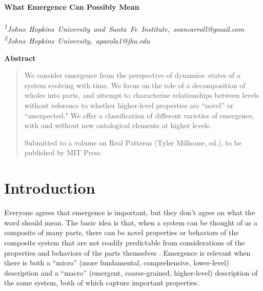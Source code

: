 \documentclass[12pt,english]{article}
\begin{document}
\baselineskip=16pt

\vspace{1cm}
\thispagestyle{empty}
\begin{center}
{\LARGE\bf
What Emergence Can Possibly Mean
}\\
\bigskip{} \\
 {\it \textsuperscript{1}\mbox{Johns Hopkins University and Santa Fe Institute, seancarroll@gmail.com}\vspace{1mm}
\textsuperscript{2}\mbox{Johns Hopkins University, aparola1@jhu.edu}\vspace{1mm}
}
 \end{center}
\bigskip
\centerline{\large\bf Abstract}



\begin{quote} \small
    We consider emergence from the perspective of dynamics: states of a system evolving with time.
    We focus on the role of a decomposition of wholes into parts, and attempt to characterize relationships between levels without reference to whether higher-level properties are ``novel'' or ``unexpected." 
    We offer a classification of different varieties of emergence, with and without new ontological elements at higher levels.

    Submitted to a volume on Real Patterns (Tyler Milhouse, ed.), to be published by MIT Press.
\end{quote}



\section*{Introduction}

Everyone agrees that emergence is important, but they don't agree on what the word should mean. 
The basic idea is that, when a system can be thought of as a composite of many parts, there can be novel properties or behaviors of the composite system that are not readily predictable from considerations of the properties and behaviors of the parts themselves \cite{gibb2019routledge,wilson2021metaphysical}.
Emergence is relevant when there is both a ``micro'' (more fundamental, comprehensive, lower-level) description and a ``macro'' (emergent, coarse-grained, higher-level) description of the same system, both of which capture important properties.
\end{document}
